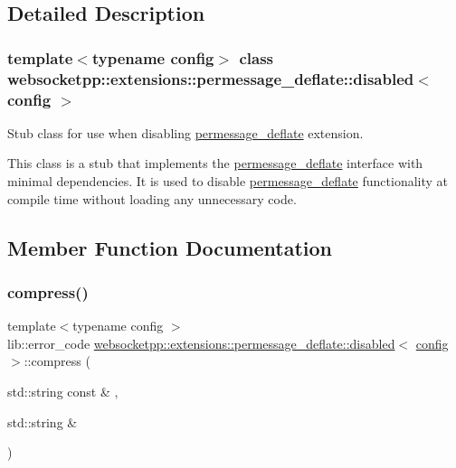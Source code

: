 \subsection{Detailed Description}
\subsubsection*{template$<$typename config$>$\newline
class websocketpp\+::extensions\+::permessage\+\_\+deflate\+::disabled$<$ config $>$}

Stub class for use when disabling \mbox{\hyperlink{namespacewebsocketpp_1_1extensions_1_1permessage__deflate}{permessage\+\_\+deflate}} extension. 

This class is a stub that implements the \mbox{\hyperlink{namespacewebsocketpp_1_1extensions_1_1permessage__deflate}{permessage\+\_\+deflate}} interface with minimal dependencies. It is used to disable \mbox{\hyperlink{namespacewebsocketpp_1_1extensions_1_1permessage__deflate}{permessage\+\_\+deflate}} functionality at compile time without loading any unnecessary code. 

\subsection{Member Function Documentation}
\mbox{\label{classwebsocketpp_1_1extensions_1_1permessage__deflate_1_1disabled_a3ef2c3020ea3b8d531d3cee03bf8eadf}} 
\subsubsection{\texorpdfstring{compress()}{compress()}}
{\footnotesize\ttfamily template$<$typename config $>$ \\
lib\+::error\+\_\+code \mbox{\hyperlink{classwebsocketpp_1_1extensions_1_1permessage__deflate_1_1disabled}{websocketpp\+::extensions\+::permessage\+\_\+deflate\+::disabled}}$<$ \mbox{\hyperlink{classconfig}{config}} $>$\+::compress (\begin{DoxyParamCaption}\item[{std\+::string const \&}]{,  }\item[{std\+::string \&}]{ }\end{DoxyParamCaption})\hspace{0.3cm}{\ttfamily [inline]}}



